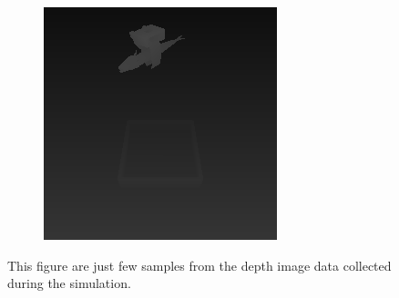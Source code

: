 \begin{figure}
\begin{subfigure}[t]{0.33\textwidth}
\end{subfigure}%
    \hfill
\begin{subfigure}[t]{0.33\textwidth}
\centering
\includegraphics[width=\linewidth]{figures/simulation/grabbed-depth}
\end{subfigure}
\caption{This figure are just few samples from the depth image data collected during the simulation.}
\end{figure}